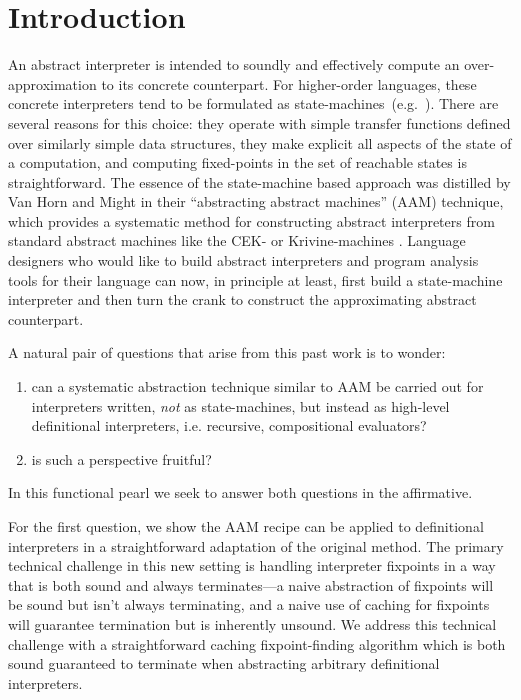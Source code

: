 \section{Introduction}

An abstract interpreter is intended to soundly and effectively compute
an over-approximation to its concrete counterpart.  For higher-order
languages, these concrete interpreters tend to be formulated as
state-machines~(e.g.~\cite{dvanhorn:jagannathan-weeks-popl95,
  dvanhorn:jagannathan-etal-popl98, 
  dvanhorn:wright-jagannathan-toplas98,
  dvanhorn:Might:2006:DeltaCFA,
  dvanhorn:midtgaard-jensen-sas-08,
  dvanhorn:Midtgaard2009Controlflow,
  dvanhorn:Might2011Family, dvanhorn:Sergey2013Monadic}).  There are
several reasons for this choice: they operate with simple transfer
functions defined over similarly simple data structures, they make
explicit all aspects of the state of a computation, and computing
fixed-points in the set of reachable states is straightforward.
%
The essence of the state-machine based approach was distilled by Van
Horn and Might in their ``abstracting abstract machines'' (AAM)
technique, which provides a systematic method for constructing
abstract interpreters from standard abstract machines like the CEK- or
Krivine-machines \cite{dvanhorn:VanHorn2010Abstracting}.  Language
designers who would like to build abstract interpreters and program
analysis tools for their language can now, in principle at least,
first build a state-machine interpreter and then turn the crank to
construct the approximating abstract counterpart.

A natural pair of questions that arise from this past work is to
wonder:
\begin{enumerate}
  \item can a systematic abstraction technique similar to AAM  be
carried out for interpreters written, \emph{not} as state-machines,
but instead as high-level definitional interpreters, i.e. recursive,
compositional evaluators?
\item  is such a perspective fruitful?
\end{enumerate}
In this functional pearl we seek to answer both questions in the
affirmative.

For the first question, we show the AAM recipe can be applied
to definitional interpreters in a straightforward adaptation of the
original method. The primary technical challenge in this new setting
is handling interpreter fixpoints in a way that is both sound and
always terminates---a naive abstraction of fixpoints will be sound but
isn't always terminating, and a naive use of caching for fixpoints
will guarantee termination but is inherently unsound. We address this
technical challenge with a straightforward caching fixpoint-finding
algorithm which is both sound guaranteed to terminate when abstracting
arbitrary definitional interpreters.

